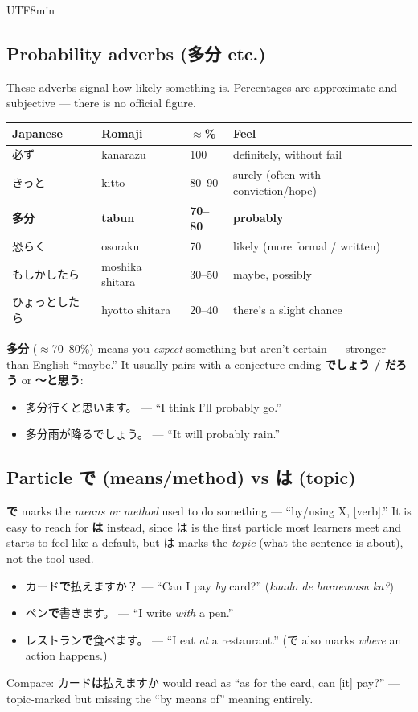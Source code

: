 \documentclass[11pt]{article}
\begin{document}
\begin{CJK}{UTF8}{min}
\subsection{Probability adverbs (\texorpdfstring{多分}{tabun} etc.)}
These adverbs signal how likely something is. Percentages are approximate and
subjective --- there is no official figure.
\begin{center}
\begin{tabular}{@{}llll@{}}
\toprule
Japanese & Romaji & $\approx$\% & Feel \\
\midrule
必ず           & kanarazu        & 100 & definitely, without fail \\
きっと         & kitto           & 80--90 & surely (often with conviction/hope) \\
\textbf{多分}  & \textbf{tabun}  & \textbf{70--80} & \textbf{probably} \\
恐らく         & osoraku         & 70 & likely (more formal / written) \\
もしかしたら   & moshika shitara & 30--50 & maybe, possibly \\
ひょっとしたら & hyotto shitara  & 20--40 & there's a slight chance \\
\bottomrule
\end{tabular}
\end{center}
\textbf{多分} ($\approx$70--80\%) means you \emph{expect} something but aren't
certain --- stronger than English ``maybe.'' It usually pairs with a conjecture
ending \textbf{でしょう / だろう} or \textbf{〜と思う}:
\begin{itemize}
  \item 多分行くと思います。 --- ``I think I'll probably go.''
  \item 多分雨が降るでしょう。 --- ``It will probably rain.''
\end{itemize}

\subsection{Particle \texorpdfstring{で}{de} (means/method) vs \texorpdfstring{は}{wa} (topic)}
\textbf{で} marks the \emph{means or method} used to do something --- ``by/using
X, [verb].'' It is easy to reach for \textbf{は} instead, since は is the first
particle most learners meet and starts to feel like a default, but は marks the
\emph{topic} (what the sentence is about), not the tool used.
\begin{itemize}
  \item カード\textbf{で}払えますか？ --- ``Can I pay \emph{by} card?''
        (\emph{kaado de haraemasu ka?})
  \item ペン\textbf{で}書きます。 --- ``I write \emph{with} a pen.''
  \item レストラン\textbf{で}食べます。 --- ``I eat \emph{at} a restaurant.''
        (で also marks \emph{where} an action happens.)
\end{itemize}
Compare: カード\textbf{は}払えますか would read as ``as for the card, can [it]
pay?'' --- topic-marked but missing the ``by means of'' meaning entirely.


\end{CJK}
\end{document}
